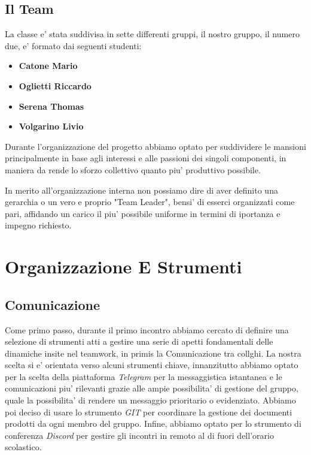 \documentclass{report}
\begin{document}
        \section{Il Team}
            La classe e' stata suddivisa in sette differenti gruppi, il nostro gruppo, il numero due, e' formato dai 
             seguenti studenti:
             \begin{itemize}
                 \item \textbf{Catone Mario}
                 \item \textbf{Oglietti Riccardo}
                 \item \textbf{Serena Thomas}
                 \item \textbf{Volgarino Livio}
             \end{itemize}
            Durante l'organizzazione del progetto abbiamo optato per suddividere le mansioni principalmente in base agli
             interessi e alle passioni dei singoli componenti, in maniera da rende lo sforzo collettivo quanto piu'
             produttivo possibile. 

            In merito all'organizzazione interna non possiamo dire di aver definito una gerarchia o un vero e proprio 
             "Team Leader", bensi' di esserci organizzati come pari, affidando un carico il piu' possibile uniforme in 
             termini di iportanza e impegno richiesto.

    \chapter{Organizzazione E Strumenti}        
        \section{Comunicazione}
            Come primo passo, durante il primo incontro abbiamo cercato di definire una selezione di strumenti atti a 
             gestire una serie di apetti fondamentali delle dinamiche insite nel teamwork, in primis la Comunicazione
             tra collghi.
            La nostra scelta si e' orientata verso alcuni strumenti chiave, innanzitutto abbiamo optato per la scelta
             della piattaforma \emph{Telegram} per la messaggistica istantanea e le comunicazioni piu' rilevanti grazie
             alle ampie possibilita' di gestione del gruppo, quale la possibilita' di rendere un messaggio prioritario o
             evidenziato. Abbiamo poi deciso di usare lo strumento \emph{GIT} per coordinare la gestione dei documenti
             prodotti da ogni membro del gruppo. Infine, abbiamo optato per lo strumento di conferenza \emph{Discord} per
             gestire gli incontri in remoto al di fuori dell'orario scolastico.
\end{document}
